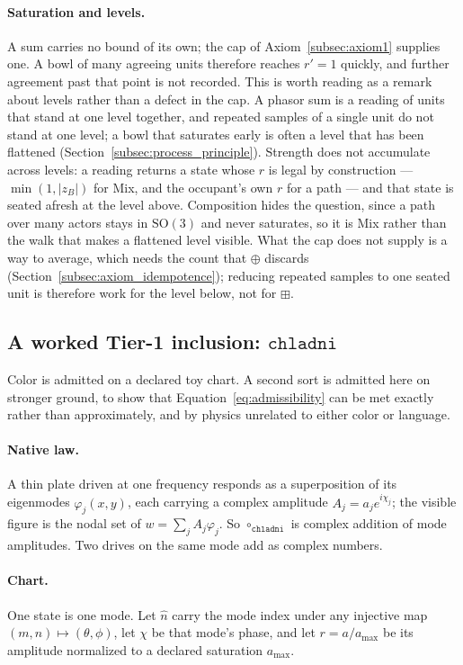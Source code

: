 \documentclass[12pt, a4paper]{article}
\begin{document}
\paragraph{Saturation and levels.}
A sum carries no bound of its own; the cap of
Axiom~\ref{subsec:axiom1} supplies one. A bowl of many agreeing units
therefore reaches $r'=1$ quickly, and further agreement past that
point is not recorded. This is worth reading as a remark about levels
rather than a defect in the cap. A phasor sum is a reading of units
that stand at one level together, and repeated samples of a single
unit do not stand at one level; a bowl that saturates early is often a
level that has been flattened
(Section~\ref{subsec:process_principle}). Strength does not
accumulate across levels: a reading returns a state whose $r$ is legal
by construction --- $\min(1,|z_B|)$ for Mix, and the occupant's own
$r$ for a path --- and that state is seated afresh at the level above.
Composition hides the question, since a path over many actors stays in
$\mathrm{SO}(3)$ and never saturates, so it is Mix rather than the
walk that makes a flattened level visible. What the cap does not
supply is a way to average, which needs the count that $\oplus$
discards (Section~\ref{subsec:axiom_idempotence}); reducing repeated
samples to one seated unit is therefore work for the level below, not
for $\boxplus$.

\subsection{A worked Tier-1 inclusion: \texorpdfstring{$\mathtt{chladni}$}{chladni}}
\label{subsec:chladni_inclusion}
Color is admitted on a declared toy chart. A second sort is admitted
here on stronger ground, to show that
Equation~\eqref{eq:admissibility} can be met exactly rather than
approximately, and by physics unrelated to either color or language.

\paragraph{Native law.}
A thin plate driven at one frequency responds as a superposition of
its eigenmodes $\varphi_j(x,y)$, each carrying a complex amplitude
$A_j=a_j e^{i\chi_j}$; the visible figure is the nodal set of
$w=\sum_j A_j\varphi_j$. So $\circ_{\mathtt{chladni}}$ is complex
addition of mode amplitudes. Two drives on the same mode add as
complex numbers.

\paragraph{Chart.}
One state is one mode. Let $\hat n$ carry the mode index under any
injective map $(m,n)\mapsto(\theta,\phi)$, let $\chi$ be that mode's
phase, and let $r=a/a_{\max}$ be its amplitude normalized to a
declared saturation $a_{\max}$.
\end{document}
